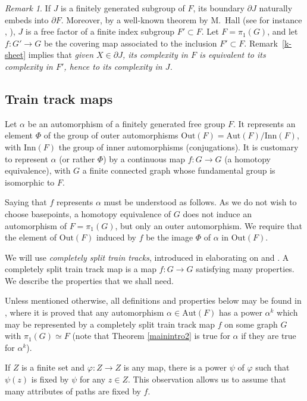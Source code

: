 \documentclass[11pt]{amsart}
\theoremstyle{remark}
\newtheorem{rem}[thm]{Remark}
\newcommand{\Out} {{\mathrm{Out}}}
\newcommand{\Aut} {{\mathrm{Aut}}}
\newcommand{\Inn} {{\mathrm{Inn}}}
\newcommand{\inc}{\subset}
\newcommand{\bo}{\partial}
\begin{document}
\begin{rem}\label{restr} 
 If $J$ is a finitely generated subgroup of $F$, its boundary $\bo J$ naturally embeds into $\bo F$. Moreover, by a well-known theorem by M.\ Hall   (see for instance  \cite{LS}, \cite{stal}), $J$ is a free factor of a finite index subgroup $F'\inc F$. 
Let  $F=\pi_1(G)$, and let $f:G'\to G$ be the  covering map associated to the inclusion $F'\inc F$. Remark~\ref{k-sheet}    implies that 
 \emph{given $X\in\bo J$, its complexity in $F$ is equivalent to its complexity in $ F'$, hence to its complexity in $J$.}
\end{rem}
 
\subsection{Train track maps}\label{cstt}

Let $\alpha$ be an automorphism of a finitely generated free group $F$.    It represents an element $\Phi$ of the   group of outer automorphisms $\Out(F)=\Aut(F)/\Inn(F)$, with $\Inn(F)$ the group of inner automorphisms (conjugations).
It is customary to represent   $\alpha$     (or rather $\Phi$)   
by a continuous map $f:G\to G$ (a homotopy equivalence), with  $G$   a finite connected graph whose fundamental group is isomorphic to  $F$. 

Saying that $f$ represents $\alpha$ must be understood as follows. As we do not wish to choose basepoints, a homotopy equivalence of $G$ does not induce an automorphism of $F=\pi_1(G)$, but only an outer automorphism.
We require that the element of $\Out(F)$ induced by $f$ be the image $\Phi$ of $\alpha$   in $\Out(F)$.


We will use \emph {completely split train tracks}, introduced in \cite{recogn} elaborating on \cite{BHtrain} and \cite{Tits1}.   A completely split train track map is a map $f:G\to G$ satisfying many properties.  We describe the properties that we shall need. 

 Unless mentioned otherwise, all definitions and properties below may be found   in \cite{recogn}, where it is proved that any automorphism $\alpha\in\Aut(F)$ has a power $\alpha^k$ which may be represented by a completely split train track map   $f$ on some graph $G$ with $\pi_1(G)\simeq F$ (note that    Theorem \ref{mainintro2}   
  is true for $\alpha$ if they are true for $\alpha^k$). 
   
   If $Z$ is a finite set and $\varphi:Z\to Z$ is any map, there is a power $\psi$ of $\varphi$ such that $\psi(z)$ is fixed by $\psi$ for any $z\in Z$. This observation allows us to assume  that many attributes of   paths are fixed by $f$.
 
\end{document}
